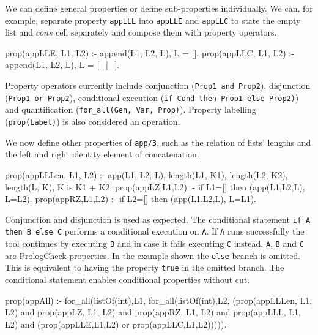 \documentclass[runningheads,a4paper]{../../PaperStyles/llncs}
\newcommand{\yap}[1]{\lstinline[style=yap]{#1}}
\newcommand{\Prolog}[0]{{\sf Prolog}}
\newcommand{\plqc}[0]{{\sf PrologCheck}}
\begin{document}
We can define general properties or define sub-properties individually. 
%
We can, for example, separate property \yap{appLLL} into
\yap{appLLE} and \yap{appLLC} to state the empty list and $cons$
cell separately and compose them with property operators.
%
\begin{yapcode}
 prop({appLLE, L1, L2}) :- append(L1, L2, L), L = [].
 prop({appLLC, L1, L2}) :- append(L1, L2, L), L = [_|_].
\end{yapcode}


Property operators currently  include conjunction
 (\yap{Prop1 and Prop2}), disjunction (\yap{Prop1 or Prop2}), conditional
execution (\yap{if Cond then Prop1 else Prop2)}) and quantification
(\yap{for_all(Gen, Var, Prop)}).
%
Property labelling (\yap{prop(Label)}) is also considered an operation.
%




We now define other properties of \yap{app/3}, such as the relation
of lists' lengths and the left and right identity element of
concatenation.
%
\begin{yapcode}
 prop({appLLLen, L1, L2}) :- app(L1, L2, L),
   length(L1, K1), length(L2, K2), length(L, K), K is K1 + K2.
 prop({appLZ,L1,L2}) :- if L1=[] then (app(L1,L2,L), L=L2).
 prop({appRZ,L1,L2}) :- if L2=[] then (app(L1,L2,L), L=L1).
\end{yapcode}
%
Conjunction and disjunction is used as expected.
%
The conditional statement \yap{if A then B else C} performs a
conditional execution on \yap{A}. 
%
If \yap{A} runs successfully the tool continues by executing \yap{B} and in case it
fails executing \yap{C} instead.
%
\yap{A}, \yap{B} and \yap{C} are \plqc{} properties.
%
In the example shown the \yap{else} branch is omitted.
%
This is equivalent to having the property \yap{true} in the omitted branch.
%
The conditional statement enables conditional properties without cut. %
%
\begin{yapcode}
 prop(appAll) :- for_all(listOf(int),L1, for_all(listOf(int),L2,
   (prop({appLLLen, L1, L2}) and prop({appLZ, L1, L2})
   and prop({appRZ, L1, L2}) and prop({appLLL, L1, L2})
   and (prop({appLLE,L1,L2}) or prop({appLLC,L1,L2}))))).
\end{yapcode}
\end{document}
